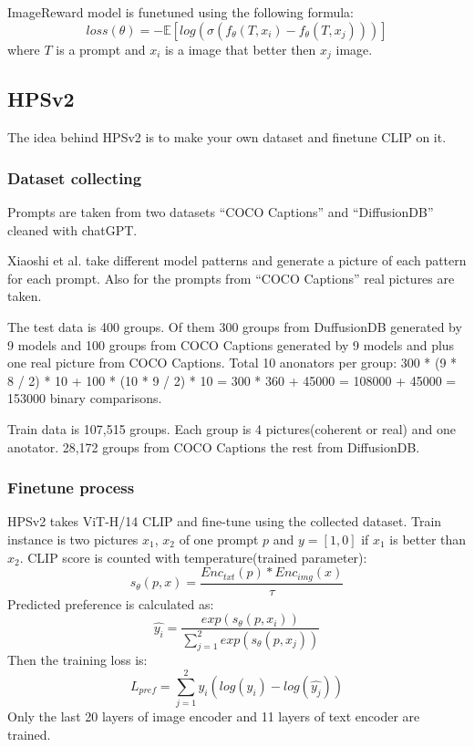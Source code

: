 ImageReward model is funetuned using the following formula:
\begin{equation}
loss(\theta)=-\mathbb{E}[log(\sigma(f_\theta(T,x_i) - f_\theta(T,x_j)))]
\end{equation}
where $T$ is a prompt and $x_i$ is a image that better then $x_j$ image.
\subsection{HPSv2}
The idea behind HPSv2\cite{HPSv2} is to make your own dataset and finetune CLIP on it.
\subsubsection{Dataset collecting}
Prompts are taken from two datasets “COCO Captions” and “DiffusionDB” cleaned with chatGPT.

Xiaoshi et al. take different model patterns and generate a picture of each pattern for each prompt. Also for the prompts from “COCO Captions” real pictures are taken\cite{HPSv2}.

The test data is 400 groups. Of them 300 groups from DuffusionDB generated by 9 models and 100 groups from COCO Captions generated by 9 models and plus one real picture from COCO Captions. Total 10 anonators per group: 300 * (9 * 8 / 2) * 10 + 100 * (10 * 9 / 2) * 10 = 300 * 360 + 45000 = 108000 + 45000 = 153000 binary comparisons.


Train data is 107,515 groups. Each group is 4 pictures(coherent or real) and one anotator. 28,172 groups from COCO Captions the rest from DiffusionDB.

\subsubsection{Finetune process}
HPSv2 takes ViT-H/14 CLIP and fine-tune using the collected dataset. Train instance is two pictures $x_1$, $x_2$ of one prompt $p$ and $y=[1,0]$ if $x_1$ is better than $x_2$. CLIP score is counted with temperature(trained parameter):
\begin{equation}
s_\theta(p,x)=\frac{Enc_{txt}(p)*Enc_{img}(x)}{\tau}
\end{equation}
Predicted preference is calculated as:
\begin{equation}
\hat{y_i}=\frac{exp(s_\theta(p,x_i))}{\sum_{j=1}^{2}exp(s_\theta(p,x_j))}
\end{equation}
Then the training loss is:
\begin{equation}
L_{pref}=\sum_{j=1}^{2}y_i(log(y_i)-log(\hat{y_j}))
\end{equation}
Only the last 20 layers of image encoder and 11 layers of text encoder are trained.
